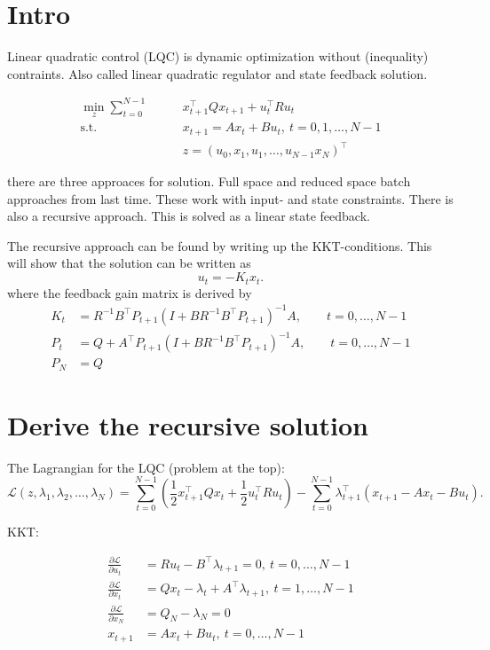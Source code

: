 \documentclass{article}
\begin{document}
\maketitle

\section{Intro}

Linear quadratic control (LQC) is dynamic optimization without (inequality) contraints. Also called linear quadratic regulator and 
state feedback solution. 

\begin{align*}
  \min_z \sum_{t=0}^{N-1}\qquad & x_{t+1}^{\top}Qx_{t+1}+u_t^{\top}Ru_t       \\
  \text{s.t.}\qquad             & x_{t+1} = Ax_t+Bu_t,\  t = 0,1,\dots,N-1    \\
                                & z = (u_0, x_1, u_1,\dots,u_{N-1}x_N)^{\top}
\end{align*}

there are three approaces for solution. Full space and reduced space batch approaches from last time. These work with input- and state constraints.
There is also a recursive approach. This is solved as a linear state feedback.

The recursive approach can be found by writing up the KKT-conditions. This will show that the solution can be written as
\[
  u_t = -K_t x_t
  .\]
where the feedback gain matrix is derived by
\begin{align*}
  K_t & = R^{-1}B^{\top}P_{t+1}(I+BR^{-1}B^{\top}P_{t+1})^{-1}A, \qquad t = 0,\dots,N-1 \\
  P_t & = Q + A^{\top}P_{t+1}(I+BR^{-1}B^{\top}P_{t+1})^{-1}A, \qquad t = 0,\dots,N-1   \\
  P_N & = Q
\end{align*}

\section{Derive the recursive solution}

The Lagrangian for the LQC (problem at the top):
\[
  \mathcal{L}(z, \lambda_1, \lambda_2,\dots,\lambda_N) = \sum_{t=0}^{N-1} (\frac{1}{2} x_{t+1}^{\top}Qx_t + \frac{1}{2}u_t^{\top}Ru_t) - \sum_{t=0}^{N-1}\lambda_{t+1}^{\top}(x_{t+1}- Ax_t - Bu_t)
  .\]

KKT:

\begin{align}
  \frac{\partial\mathcal{L}}{\partial u_t} & = Ru_t - B^{\top}\lambda_{t+1} = 0,\ t=0,\dots,N-1      \\
  \frac{\partial\mathcal{L}}{\partial x_t} & = Qx_t-\lambda_t+A^{\top}\lambda_{t+1},\  t=1,\dots,N-1 \\
  \frac{\partial\mathcal{L}}{\partial x_N} & = Q_N - \lambda_N = 0                                   \\
  x_{t+1}                                  & = Ax_t+Bu_t,\  t=0,\dots,N-1
\end{align}
\end{document}
